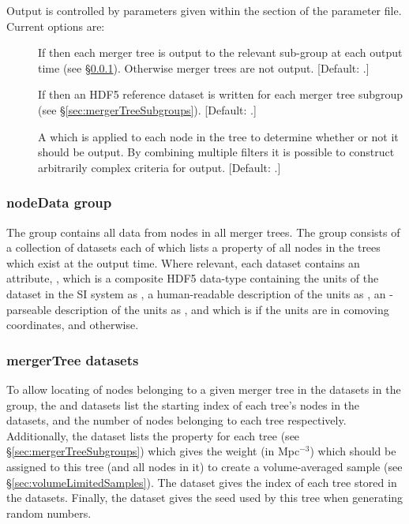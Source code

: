 Output is controlled by parameters given within the  section of the parameter file. Current options are:
\begin{description}
\item[] If  then each merger tree is output to the relevant sub-group at each output time (see \S\ref{sec:nodeDataGroup}). Otherwise merger trees are not output. [Default: .]
\item[] If  then an HDF5 reference dataset is written for each merger tree subgroup (see \S\ref{sec:mergerTreeSubgroups}). [Default: .]
\item[] A  which is applied to each node in the tree to determine whether or not it should be output. By combining multiple filters it is possible to construct arbitrarily complex criteria for output. [Default: .]
\end{description}

\subsubsection{nodeData group}\label{sec:nodeDataGroup}

The  group contains all data from nodes in all merger trees. The group consists of a collection of datasets each of which lists a property of all nodes in the trees which exist at the output time. Where relevant, each dataset contains an attribute, , which is a composite HDF5 data-type containing the units of the dataset in the SI system as , a human-readable description of the units as , an -parseable description of the units as , and  which is  if the units are in comoving coordinates, and  otherwise.

\subsubsection{mergerTree datasets}\label{sec:mergerTreeDatasets}

To allow locating of nodes belonging to a given merger tree in the datasets in the  group, the  and  datasets list the starting index of each tree's nodes in the  datasets, and the number of nodes belonging to each tree respectively. Additionally, the  dataset lists the  property for each tree (see \S\ref{sec:mergerTreeSubgroups}) which gives the weight (in Mpc$^{-3}$) which should be assigned to this tree (and all nodes in it) to create a volume-averaged sample (see \S\ref{sec:volumeLimitedSamples}). The  dataset gives the index of each tree stored in the  datasets. Finally, the  dataset gives the seed used by this tree when generating random numbers.


